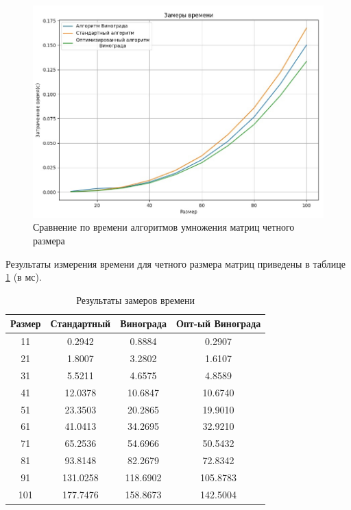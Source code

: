 \begin{figure}[H]
	\begin{center}
		\includegraphics[scale=0.5]{img/even.jpg}
	\end{center}
	\captionsetup{justification=centering}
	\caption{Сравнение по времени алгоритмов умножения матриц четного размера}
	\label{img:even}
\end{figure}

Результаты измерения времени для четного размера матриц приведены в таблице \ref{tbl:time_odd} (в мс).

\begin{table}[h]
    \begin{center}
        \begin{threeparttable}
        \captionsetup{justification=raggedright,singlelinecheck=off}
        \caption{Результаты замеров времени}
        \label{tbl:time_odd}
        \begin{tabular}{|c|c|c|c|}
            \hline
            Размер & Стандартный & Винограда & Опт-ый Винограда  \\
            \hline
			11 & 0.2942 & 0.8884 & 0.2907 \\
			\hline
			21 & 1.8007 & 3.2802 & 1.6107 \\
			\hline
			31 & 5.5211 & 4.6575 & 4.8589 \\
			\hline
			41 & 12.0378 & 10.6847 & 10.6740 \\
			\hline
			51 & 23.3503 & 20.2865 & 19.9010 \\
			\hline
			61 & 41.0413 & 34.2695 & 32.9210 \\
			\hline
			71 & 65.2536 & 54.6966 & 50.5432 \\
			\hline
			81 & 93.8148 & 82.2679 & 72.8342 \\
			\hline
			91 & 131.0258 & 118.6902 & 105.8783 \\
			\hline
			101 & 177.7476 & 158.8673 & 142.5004 \\
			\hline
		\end{tabular}
    \end{threeparttable}
\end{center}
\end{table}

